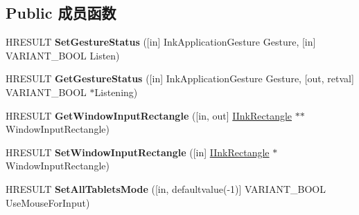 \subsection*{Public 成员函数}
\begin{DoxyCompactItemize}
\item 
\mbox{\label{interface_m_s_i_n_k_a_u_t_lib_1_1_i_ink_collector_a7063b65ab25571c49ca59429e272288e}} 
H\+R\+E\+S\+U\+LT {\bfseries Set\+Gesture\+Status} (\mbox{[}in\mbox{]} Ink\+Application\+Gesture Gesture, \mbox{[}in\mbox{]} V\+A\+R\+I\+A\+N\+T\+\_\+\+B\+O\+OL Listen)
\item 
\mbox{\label{interface_m_s_i_n_k_a_u_t_lib_1_1_i_ink_collector_aafbbfae0223cc15787c40ff55dd86c49}} 
H\+R\+E\+S\+U\+LT {\bfseries Get\+Gesture\+Status} (\mbox{[}in\mbox{]} Ink\+Application\+Gesture Gesture, \mbox{[}out, retval\mbox{]} V\+A\+R\+I\+A\+N\+T\+\_\+\+B\+O\+OL $\ast$Listening)
\item 
\mbox{\label{interface_m_s_i_n_k_a_u_t_lib_1_1_i_ink_collector_afc5dbdd73534157b9ac46f896ba9876b}} 
H\+R\+E\+S\+U\+LT {\bfseries Get\+Window\+Input\+Rectangle} (\mbox{[}in, out\mbox{]} \hyperlink{interface_m_s_i_n_k_a_u_t_lib_1_1_i_ink_rectangle}{I\+Ink\+Rectangle} $\ast$$\ast$Window\+Input\+Rectangle)
\item 
\mbox{\label{interface_m_s_i_n_k_a_u_t_lib_1_1_i_ink_collector_a071d323d79b10a9957b0c4e8021793c9}} 
H\+R\+E\+S\+U\+LT {\bfseries Set\+Window\+Input\+Rectangle} (\mbox{[}in\mbox{]} \hyperlink{interface_m_s_i_n_k_a_u_t_lib_1_1_i_ink_rectangle}{I\+Ink\+Rectangle} $\ast$Window\+Input\+Rectangle)
\item 
\mbox{\label{interface_m_s_i_n_k_a_u_t_lib_1_1_i_ink_collector_a225f2254b8857626f23f7f6570353bdd}} 
H\+R\+E\+S\+U\+LT {\bfseries Set\+All\+Tablets\+Mode} (\mbox{[}in, defaultvalue(-\/1)\mbox{]} V\+A\+R\+I\+A\+N\+T\+\_\+\+B\+O\+OL Use\+Mouse\+For\+Input)
\item 
\mbox{\label{interface_m_s_i_n_k_a_u_t_lib_1_1_i_ink_collector_adba5b863344a01b9252e696b816440ea}} 
$$
\end{DoxyCompactItemize}
